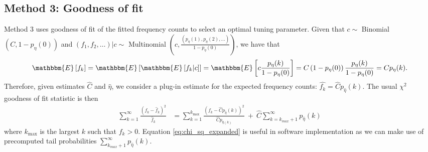 \documentclass[12pt]{article}
\newcommand{\kmax}{k_{\text{max}}}
\newcommand{\lambdagrid}{\lambda^{\text{grid}}}
\begin{document}

%
%
%
\subsection{Method 3: Goodness of fit}

Method 3 uses goodness of fit of the fitted frequency counts to select an optimal tuning parameter.
Given that $c \sim$ Binomial $\left(C, 1- p_{\eta}(0)\right)$ and $(f_1, f_2, \ldots)|c \sim$  Multinomial $\left(c,  \frac{(p_{\eta}(1), p_{\eta}(2), \ldots)}{1-p_{\eta}(0)}\right)$, we have that
\begin{equation}
 \mathbbm{E}\left[f_k\right] = \mathbbm{E}\left[\mathbbm{E}\left[f_k|c \right]\right] = \mathbbm{E}\left[ c \frac{p_{\eta}(k)}{1-p_{\eta}(0)} \right] = C\left(1-p_{\eta}(0) \right) \frac{p_{\eta}(k)}{1-p_{\eta}(0)} = Cp_{\eta}(k).
\end{equation}
Therefore, given estimates $\widehat{C}$ and $\widehat{\eta}$, we consider a plug-in estimate for the expected frequency counts: $\widehat{f_k} = \widehat{C}p_{\widehat{\eta}}(k)$.  The usual $\chi^2$ goodness of fit statistic is then
\begin{align}
\sum_{k=1}^{\infty} \frac{\left(f_k - \widehat{f}_k \right)^2 }{\widehat{f}_k} %
&= \sum_{k=1}^{\kmax} \frac{\left(f_k - \widehat{C}p_{\widehat{\eta}}(k) \right)^2 }{\widehat{C} p_{\widehat{\eta}(k)}} \ + \ \widehat{C} \sum_{k = k_{max}+1}^{\infty} p_{\widehat{\eta}}(k)
\label{eq:chi_sq_expanded}
\end{align}
where $\kmax$ is the largest $k$ such that $f_k > 0$.
Equation \eqref{eq:chi_sq_expanded} is useful in software implementation as we can make use of precomputed tail probabilities $\sum_{k_{max}+1}^{\infty} p_{\widehat{\eta}}(k)$.
\end{document}

